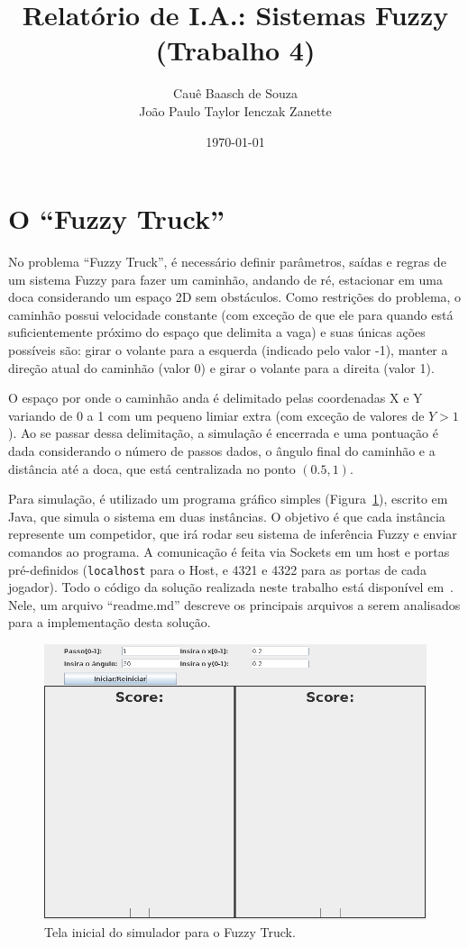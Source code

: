 \documentclass[twocolumn]{article}
\title{Relatório de I.A.: Sistemas Fuzzy (Trabalho 4)}
\author{Cauê Baasch de Souza \\
        João Paulo Taylor Ienczak Zanette}
\date{\today}
\begin{document}
    \maketitle{}

    \section{O ``Fuzzy Truck''}

    No problema ``Fuzzy Truck'', é necessário definir parâmetros, saídas e
    regras de um sistema Fuzzy para fazer um caminhão, andando de ré,
    estacionar em uma doca considerando um espaço 2D sem obstáculos. Como
    restrições do problema, o caminhão possui velocidade constante (com exceção
    de que ele para quando está suficientemente próximo do espaço que delimita
    a vaga) e suas únicas ações possíveis são: girar o volante para a esquerda
    (indicado pelo valor -1), manter a direção atual do caminhão (valor 0) e
    girar o volante para a direita (valor 1).

    O espaço por onde o caminhão anda é delimitado pelas coordenadas X e Y
    variando de 0 a 1 com um pequeno limiar extra (com exceção de valores de $Y
    > 1$). Ao se passar dessa delimitação, a simulação é encerrada e uma
    pontuação é dada considerando o número de passos dados, o ângulo final do
    caminhão e a distância até a doca, que está centralizada no ponto $(0.5,
    1)$.

    Para simulação, é utilizado um programa gráfico simples
    (Figura~\ref{simulator}), escrito em Java, que simula o sistema em duas
    instâncias. O objetivo é que cada instância represente um competidor, que
    irá rodar seu sistema de inferência Fuzzy e enviar comandos ao programa. A
    comunicação é feita via Sockets em um host e portas pré-definidos
    (\texttt{localhost} para o Host, e 4321 e 4322 para as portas de cada
    jogador). Todo o código da solução realizada neste trabalho está disponível
    em~\cite{oficial-repo}. Nele, um arquivo ``readme.md'' descreve os
    principais arquivos a serem analisados para a implementação desta solução.

    \begin{figure}[ht]
        \includegraphics[keepaspectratio,width=.5\textwidth]{img/fuzzytruck-initial}
        \caption{Tela inicial do simulador para o Fuzzy Truck.\label{simulator}}
    \end{figure}
\end{document}
